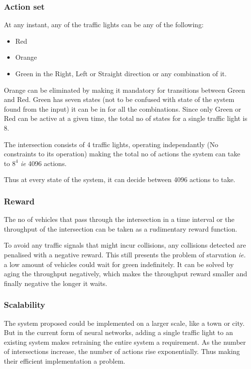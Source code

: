 \documentclass[a4paper,11pt]{article}
\begin{document}
			\subsubsection{Action set}
				At any instant, any of the traffic lights can be any of the following:
				\begin{itemize}
					\setlength\itemsep{0em}
					\item Red
					\item Orange
					\item Green in the Right, Left or Straight direction or any combination of it.
				\end{itemize}

				Orange can be eliminated by making it mandatory for transitions between Green and Red. Green has seven states (not to be confused with state of the system found from the input) it can be in for all the combinations. Since only Green or Red can be active at a given time, the total no of states for a single traffic light is 8.

				The intersection consists of 4 traffic lights, operating independantly (No constraints to its operation) making the total no of actions the system can take to $8^4$ \emph{ie} 4096 actions.

				Thus at every state of the system, it can decide between 4096 actions to take.
			\subsubsection{Reward}
				The no of vehicles that pass through the intersection in a time interval or the throughput of the intersection can be taken as a rudimentary reward function.

				To avoid any traffic signals that might incur collisions, any collisions detected are penalised with a negative reward. This still presents the problem of starvation \emph{ie.} a low amount of vehicles could wait for green indefinitely. It can be solved by aging the throughput negatively, which makes the throughput reward smaller and finally negative the longer it waits.
			\subsubsection{Scalability}
				The system proposed could be implemented on a larger scale, like a town or city. But in the current form of neural networks, adding a single traffic light to an existing system makes retraining the entire system a requirement. As the number of intersections increase, the number of actions rise exponentially. Thus making their efficient implementation a problem.
\end{document}
